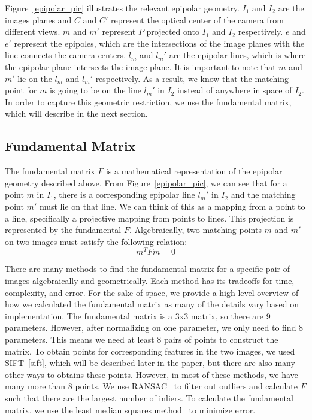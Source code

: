 Figure~\ref{epipolar_pic} illustrates the relevant epipolar geometry. $I_1$ and $I_2$ are the images planes and $C$ and $C'$ represent the optical center of the camera from different views. $m$ and $m'$ represent $P$ projected onto $I_1$ and $I_2$ respectively. $e$ and $e'$ represent the epipoles, which are the intersections of the image planes with the line connects the camera centers. $l_m$ and $l_m'$ are the epipolar lines, which is where the epipolar plane intersects the image plane. It is important to note that $m$ and $m'$ lie on the $l_m$ and $l_m'$ respectively. As a result, we know that the matching point for $m$ is going to be on the line $l_m'$ in $I_2$ instead of anywhere in space of $I_2$. In order to capture this geometric restriction, we use the fundamental matrix, which will describe in the next section.

\subsection{Fundamental Matrix}
The fundamental matrix $F$ is a mathematical representation of the epipolar geometry described above. From Figure~\ref{epipolar_pic}, we can see that for a point $m$ in $I_1$, there is a corresponding epipolar line $l_m'$ in $I_2$ and the matching point $m'$ must lie on that line. We can think of this as a mapping from a point to a line, specifically a projective mapping from points to lines. This projection is represented by the fundamental $F$. Algebraically, two matching points $m$ and $m'$ on two images must satisfy the following relation:
\begin{equation}
m^TFm = 0
\end{equation}

There are many methods to find the fundamental matrix for a specific pair of images algebraically and geometrically. Each method has its tradeoffs for time, complexity, and error. For the sake of space, we provide a high level overview of how we calculated the fundamental matrix as many of the details vary based on implementation. The fundamental matrix is a 3x3 matrix, so there are 9 parameters. However, after normalizing on one parameter, we only need to find 8 parameters. This means we need at least 8 pairs of points to construct the matrix. To obtain points for corresponding features in the two images, we used SIFT~\ref{sift}, which will be described later in the paper, but there are also many other ways to obtains these points. However, in most of these methods, we have many more than 8 points. We use RANSAC~\cite{ransac} to filter out outliers and calculate $F$ such that there are the largest number of inliers. To calculate the fundamental matrix, we use the least median squares method~\cite{lms_zhang} to minimize error. 

